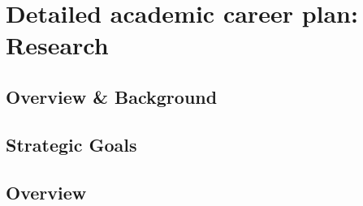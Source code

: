 \chapter{Detailed academic career plan: Research}
\label{goals}

\vspace{-10mm}



\section{Overview \& Background}

\section{Strategic Goals}


\section{Overview}
